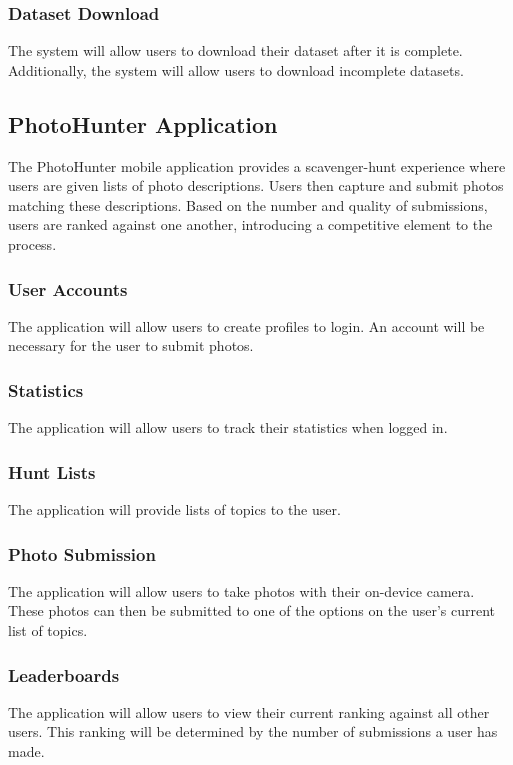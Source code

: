 \documentclass{article}
\begin{document}
	\subsubsection{Dataset Download}
	The system will allow users to download their dataset after it is complete. Additionally, the system will allow users to download incomplete datasets. 
	
	
\subsection{PhotoHunter Application}
The PhotoHunter mobile application provides a scavenger-hunt experience where users are given lists of photo descriptions. Users then capture and submit photos matching these descriptions. Based on the number and quality of submissions, users are ranked against one another, introducing a competitive element to the process.

	\subsubsection{User Accounts}
	The application will allow users to create profiles to login. An account will be necessary for the user to submit photos.
	
	\subsubsection{Statistics}
	The application will allow users to track their statistics when logged in.
	
	\subsubsection{Hunt Lists}
	The application will provide lists of topics to the user.
	
	\subsubsection{Photo Submission}
	The application will allow users to take photos with their on-device camera. These photos can then be submitted to one of the options on the user's current list of topics.
	
	\subsubsection{Leaderboards}
	The application will allow users to view their current ranking against all other users. This ranking will be determined by the number of submissions a user has made.
	
\end{document}
